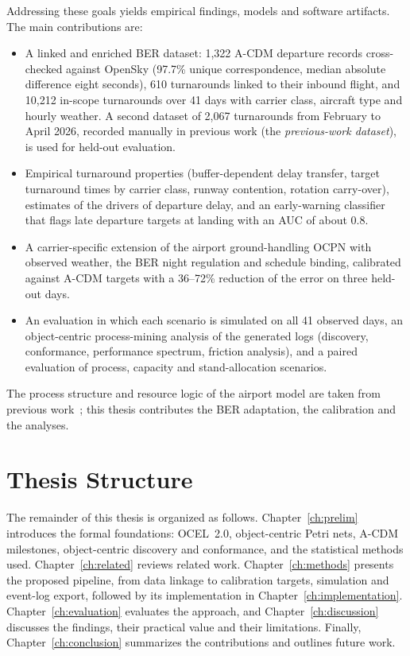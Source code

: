 Addressing these goals yields empirical findings, models and software artifacts. The main contributions are:
\begin{itemize}
\item A linked and enriched BER dataset: 1,322 A-CDM departure records cross-checked against OpenSky (97.7\% unique correspondence, median absolute difference eight seconds), 610 turnarounds linked to their inbound flight, and 10,212 in-scope turnarounds over 41 days with carrier class, aircraft type and hourly weather. A second dataset of 2,067 turnarounds from February to April 2026, recorded manually in previous work (the \emph{previous-work dataset}), is used for held-out evaluation.
\item Empirical turnaround properties (buffer-dependent delay transfer, target turnaround times by carrier class, runway contention, rotation carry-over), estimates of the drivers of departure delay, and an early-warning classifier that flags late departure targets at landing with an AUC of about 0.8.
\item A carrier-specific extension of the airport ground-handling OCPN with observed weather, the BER night regulation and schedule binding, calibrated against A-CDM targets with a 36--72\% reduction of the error on three held-out days.
\item An evaluation in which each scenario is simulated on all 41 observed days, an object-centric process-mining analysis of the generated logs (discovery, conformance, performance spectrum, friction analysis), and a paired evaluation of process, capacity and stand-allocation scenarios.
\end{itemize}
The process structure and resource logic of the airport model are taken from previous work~\cite{ocpn_studio}; this thesis contributes the BER adaptation, the calibration and the analyses.

\section{Thesis Structure}
\label{sec:structure}

The remainder of this thesis is organized as follows. Chapter~\ref{ch:prelim} introduces the formal foundations: OCEL~2.0, object-centric Petri nets, A-CDM milestones, object-centric discovery and conformance, and the statistical methods used. Chapter~\ref{ch:related} reviews related work. Chapter~\ref{ch:methods} presents the proposed pipeline, from data linkage to calibration targets, simulation and event-log export, followed by its implementation in Chapter~\ref{ch:implementation}. Chapter~\ref{ch:evaluation} evaluates the approach, and Chapter~\ref{ch:discussion} discusses the findings, their practical value and their limitations. Finally, Chapter~\ref{ch:conclusion} summarizes the contributions and outlines future work.
